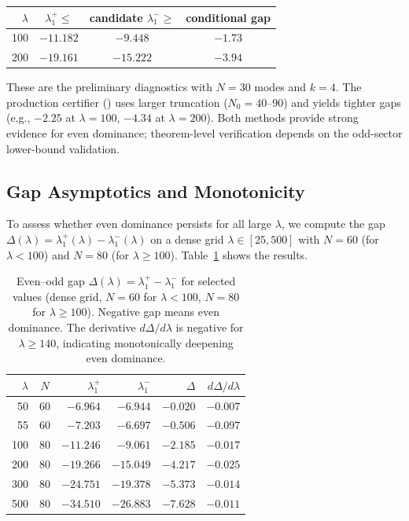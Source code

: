 \documentclass[12pt,a4paper]{article}
\theoremstyle{definition}
\theoremstyle{remark}
\begin{document}
\begin{center}
\renewcommand{\arraystretch}{1.2}
\begin{tabular}{r|c|c|c}
$\lambda$ & $\lambda_1^+ \leq$ & candidate $\lambda_1^- \geq$ & conditional gap \\\hline
100 & $-11.182$ & $-9.448$ & $\mathbf{-1.73}$ \\
200 & $-19.161$ & $-15.222$ & $\mathbf{-3.94}$
\end{tabular}
\end{center}

\noindent These are the preliminary diagnostics with $N = 30$ modes and $k = 4$. The production certifier () uses larger truncation ($N_0 = 40$--$90$) and yields tighter gaps (e.g., $-2.25$ at $\lambda = 100$, $-4.34$ at $\lambda = 200$). Both methods provide strong evidence for even dominance; theorem-level verification depends on the odd-sector lower-bound validation.

\subsection{Gap Asymptotics and Monotonicity}
\label{sec:gap-asymptotics}

To assess whether even dominance persists for all large $\lambda$, we compute the gap $\Delta(\lambda) = \lambda_1^+(\lambda) - \lambda_1^-(\lambda)$ on a dense grid $\lambda \in [25, 500]$ with $N = 60$ (for $\lambda < 100$) and $N = 80$ (for $\lambda \geq 100$). Table~\ref{tab:gap-asymp} shows the results.

\begin{table}[h]
\centering
\small
\renewcommand{\arraystretch}{1.15}
\begin{tabular}{r|c|r|r|r|r}
$\lambda$ & $N$ & $\lambda_1^+$ & $\lambda_1^-$ & $\Delta$ & $d\Delta/d\lambda$ \\\hline
50  & 60 & $-6.964$ & $-6.944$ & $-0.020$ & $-0.007$ \\
55  & 60 & $-7.203$ & $-6.697$ & $-0.506$ & $-0.097$ \\
100 & 80 & $-11.246$ & $-9.061$ & $-2.185$ & $-0.017$ \\
200 & 80 & $-19.266$ & $-15.049$ & $-4.217$ & $-0.025$ \\
300 & 80 & $-24.751$ & $-19.378$ & $-5.373$ & $-0.014$ \\
500 & 80 & $-34.510$ & $-26.883$ & $-7.628$ & $-0.011$
\end{tabular}
\caption{Even--odd gap $\Delta(\lambda) = \lambda_1^+ - \lambda_1^-$ for selected values (dense grid, $N=60$ for $\lambda < 100$, $N=80$ for $\lambda \geq 100$). Negative gap means even dominance. The derivative $d\Delta/d\lambda$ is negative for $\lambda \geq 140$, indicating monotonically deepening even dominance.}
\label{tab:gap-asymp}
\end{table}
\end{document}
